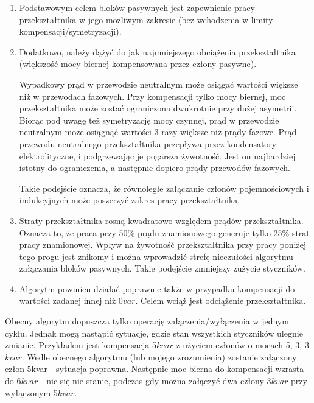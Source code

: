 \documentclass[12pt,a4paper]{article}
\begin{document}
\begin{enumerate}
	\vspace{-2mm}
	\setlength\itemsep{0mm}
	\item Podstawowym celem bloków pasywnych jest zapewnienie pracy przekształtnika w jego możliwym zakresie (bez wchodzenia w limity kompensacji/symetryzacji).
	\item Dodatkowo, należy dążyć do jak najmniejszego obciążenia przekształtnika (większość mocy biernej kompensowana przez człony pasywne).
	
	\indent Wypadkowy prąd w przewodzie neutralnym może osiągać wartości większe niż w przewodach fazowych. Przy kompensacji tylko mocy biernej, moc przekształtnika może zostać ograniczona dwukrotnie przy dużej asymetrii. Biorąc pod uwagę też symetryzację mocy czynnej, prąd w przewodzie neutralnym może osiągnąć wartości 3 razy większe niż prądy fazowe. Prąd przewodu neutralnego przekształtnika przepływa przez kondensatory elektrolityczne, i podgrzewając je pogarsza żywotność. Jest on najbardziej istotny do ograniczenia, a następnie dopiero prądy przewodów fazowych.
	
	Takie podejście oznacza, że równoległe załączanie członów pojemnościowych i indukcyjnych może poszerzyć zakres pracy przekształtnika.
	
	\item Straty przekształtnika rosną kwadratowo względem prądów przekształtnika. Oznacza to, że praca przy 50\% prądu znamionowego generuje tylko 25\% strat pracy znamionowej. Wpływ na żywotność przekształtnika przy pracy poniżej tego progu jest znikomy i można wprowadzić strefę nieczułości algorytmu załączania bloków pasywnych. Takie podejście zmniejszy zużycie styczników.
	
	\item Algorytm powinien działać poprawnie także w przypadku kompensacji do wartości zadanej innej niż 0$var$. Celem wciąż jest odciążenie przekształtnika.
\end{enumerate}

Obecny algorytm dopuszcza tylko operację załączenia/wyłączenia w jednym cyklu. Jednak mogą nastąpić sytuacje, gdzie stan wszystkich styczników ulegnie zmianie. Przykładem jest kompensacja 5$kvar$ z użyciem członów o mocach 5, 3, 3$kvar$. Wedle obecnego algorytmu (lub mojego zrozumienia) zostanie załączony człon 5kvar - sytuacja poprawna. Następnie moc bierna do kompensacji wzrasta do 6$kvar$ - nic się nie stanie, podczas gdy można załączyć dwa człony 3$kvar$ przy wyłączonym 5$kvar$.
\end{document}
